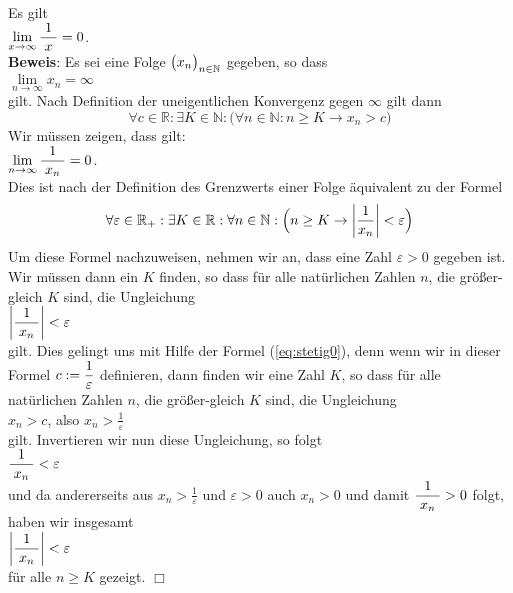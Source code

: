 \example 
Es gilt
\\[0.2cm]
\hspace*{1.3cm}      
$\lim\limits_{x\rightarrow\infty} \displaystyle\frac{\;\displaystyle1\;}{\;\displaystyle x\;} = 0$.
\\[0.2cm]
\textbf{Beweis}:  Es sei eine Folge $\bigl(x_n\bigr)_{n\in\mathbb{N}}$ gegeben, so dass 
\\[0.2cm]
\hspace*{1.3cm}      
$\lim\limits_{n\rightarrow\infty} x_n = \infty$
\\[0.2cm]
gilt.   Nach Definition der uneigentlichen Konvergenz gegen $\infty$ gilt dann
\begin{equation}
  \label{eq:stetig0}  
  \forall c \in \mathbb{R}: \exists K \in \mathbb{N}:\bigl(\forall n \in \mathbb{N}: n \geq K \rightarrow x_n > c\bigr)
\end{equation}
Wir m\"ussen zeigen, dass gilt:
\\[0.2cm]
\hspace*{1.3cm}
$\displaystyle \lim\limits_{n\rightarrow\infty} \displaystyle\frac{\;\displaystyle1\;}{\;\displaystyle x_n\;} = 0$.
\\[0.2cm]
Dies ist nach der Definition des Grenzwerts einer Folge \"aquivalent zu der Formel
\begin{equation}
  \label{eq:stetig1}
  \forall \varepsilon \in\mathbb{R}_+: \exists K \in \mathbb{R} : \forall n \in \mathbb{N}
  :\Bigl(n \geq K \rightarrow \left|\frac{1}{x_n}\right| < \varepsilon\Bigr)
\end{equation}
Um diese Formel nachzuweisen, nehmen wir an, dass eine Zahl $\varepsilon>0$
gegeben ist.  Wir m\"ussen dann ein $K$ finden, so dass f\"ur alle nat\"urlichen Zahlen $n$, die
gr\"o{\ss}er-gleich $K$ sind, die Ungleichung 
\\[0.2cm]
\hspace*{1.3cm} $\left|\displaystyle\frac{\;\displaystyle1\;}{\;\displaystyle x_n\;}\right| < \varepsilon$
\\[0.2cm]
gilt.  Dies gelingt uns mit Hilfe der Formel (\ref{eq:stetig0}), denn wenn wir in dieser Formel
$\displaystyle c := \frac{1}{\varepsilon}$ definieren, dann finden wir eine Zahl $K$, so dass f\"ur alle
nat\"urlichen Zahlen $n$, die
gr\"o{\ss}er-gleich $K$ sind, die Ungleichung  
\\[0.2cm] \hspace*{1.3cm} $\displaystyle x_n > c$, \quad also $\displaystyle x_n > \frac{1}{\varepsilon}$ \\[0.2cm]
gilt.  Invertieren wir nun diese Ungleichung, so folgt
\\[0.2cm]
\hspace*{1.3cm}
$\displaystyle\frac{\;\displaystyle1\;}{\;\displaystyle x_n\;} < \varepsilon$
\\[0.2cm]
und da andererseits aus $x_n > \frac{1}{\varepsilon}$ und $\varepsilon > 0$ auch $x_n > 0$
und damit $\displaystyle\frac{\;\displaystyle1\;}{\;\displaystyle x_n\;} > 0$ folgt, haben wir insgesamt 
\\[0.2cm]
\hspace*{1.3cm}
$\left|\displaystyle\frac{\;\displaystyle1\;}{\;\displaystyle x_n\;}\right| < \varepsilon$
\\[0.2cm]
f\"ur alle $n \geq K$ gezeigt. \hspace*{\fill} $\Box$
\vspace*{0.3cm}

